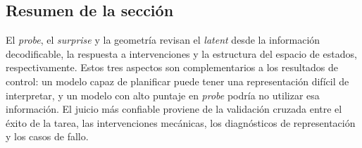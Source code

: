 
\subsection{Resumen de la sección}

El \textit{probe}, el \textit{surprise} y la geometría revisan el \textit{latent} desde la información decodificable, la respuesta a intervenciones y la estructura del espacio de estados, respectivamente. Estos tres aspectos son complementarios a los resultados de control: un modelo capaz de planificar puede tener una representación difícil de interpretar, y un modelo con alto puntaje en \textit{probe} podría no utilizar esa información. El juicio más confiable proviene de la validación cruzada entre el éxito de la tarea, las intervenciones mecánicas, los diagnósticos de representación y los casos de fallo.

